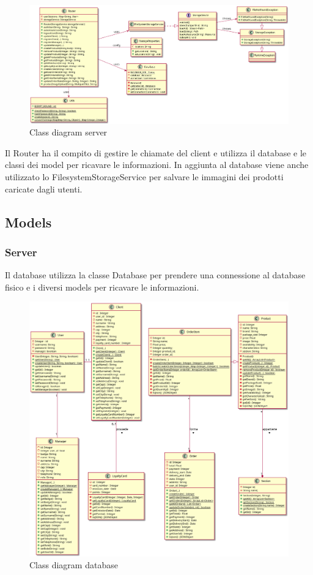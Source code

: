 \documentclass[12pt, a4paper]{report}
\begin{document}
\begin{figure}[h]
  \centering
  \includegraphics[width=\textwidth]{router_class.png}
  \caption{Class diagram server}
\end{figure}

Il Router ha il compito di gestire le chiamate del client e utilizza il
database e le classi dei model per ricavare le informazioni. In aggiunta al
database viene anche utilizzato lo FilesystemStorageService per salvare le
immagini dei prodotti caricate dagli utenti.

\newpage

\subsection{Models}

\subsubsection{Server}

Il database utilizza la classe Database per prendere una con\-nes\-sio\-ne al
da\-ta\-ba\-se fisico e i diversi models per ricavare le informazioni.

\begin{figure}[h]
  \centering
  \includegraphics[width=\textwidth]{database_models_class.png}
  \caption{Class diagram database}
\end{figure}
\end{document}
